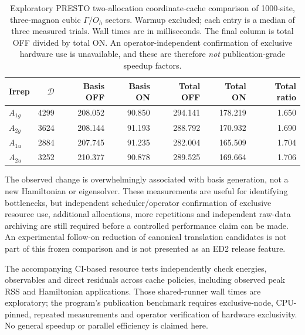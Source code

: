 \documentclass[preprint,12pt,nopreprintline]{elsarticle}
\begin{document}
\begin{table}[t]
\centering
\caption{Exploratory PRESTO two-allocation coordinate-cache
comparison of 1000-site, three-magnon cubic $\Gamma/O_h$
sectors. Warmup excluded; each entry is a median of three
measured trials. Wall times are in milliseconds.
The final column is total OFF divided by total ON.
An operator-independent confirmation of exclusive
hardware use is unavailable, and these are therefore
\emph{not} publication-grade speedup factors.}
\label{tab:pr17-pilot}
\small
\begin{tabular}{lrrrrrr}
\toprule
Irrep & $\mathcal D$ & Basis OFF & Basis ON &
Total OFF & Total ON & Total ratio \\
\midrule
$A_{1g}$ & 4299 & 208.052 & 90.850 & 294.141 & 178.219 & 1.650 \\
$A_{2g}$ & 3624 & 208.144 & 91.193 & 288.792 & 170.932 & 1.690 \\
$A_{1u}$ & 2884 & 207.745 & 91.235 & 282.004 & 165.509 & 1.704 \\
$A_{2u}$ & 3252 & 210.377 & 90.878 & 289.525 & 169.664 & 1.706 \\
\bottomrule
\end{tabular}
\end{table}

The observed change is overwhelmingly associated with basis
generation, not a new Hamiltonian or eigensolver.
These measurements are useful for identifying bottlenecks,
but independent scheduler/operator confirmation of
exclusive resource use, additional allocations, more
repetitions and independent raw-data archiving are still
required before a controlled performance claim can be made.
An experimental follow-on reduction of canonical
translation candidates is not part of this frozen
comparison and is not presented as an ED2 release feature.

The accompanying CI-based resource tests independently check
energies, observables and direct residuals across cache policies,
including observed peak RSS and Hamiltonian applications.
Those shared-runner wall times are exploratory; the program's
publication benchmark requires exclusive-node,
CPU-pinned, repeated measurements and operator
verification of hardware exclusivity. No general speedup
or parallel efficiency is claimed here.
\end{document}

